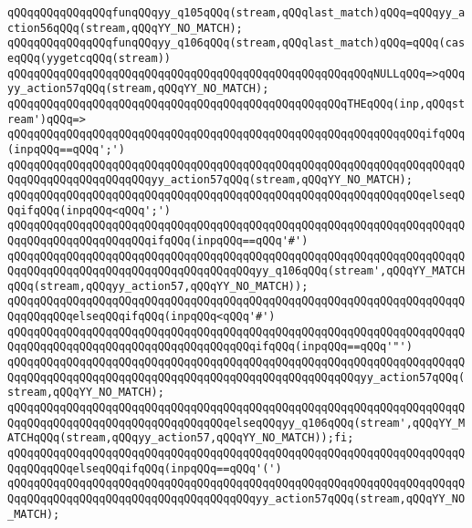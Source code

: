\verb|qQQqqQQqqQQqqQQqfunqQQqyy_q105qQQq(stream,qQQqlast_match)qQQq=qQQqyy_action56qQQq(stream,qQQqYY_NO_MATCH);|\newline
\verb|qQQqqQQqqQQqqQQqfunqQQqyy_q106qQQq(stream,qQQqlast_match)qQQq=qQQq(caseqQQq(yygetcqQQq(stream))|\newline
\verb|qQQqqQQqqQQqqQQqqQQqqQQqqQQqqQQqqQQqqQQqqQQqqQQqqQQqqQQqNULLqQQq=>qQQqyy_action57qQQq(stream,qQQqYY_NO_MATCH);|\newline
\verb|qQQqqQQqqQQqqQQqqQQqqQQqqQQqqQQqqQQqqQQqqQQqqQQqqQQqTHEqQQq(inp,qQQqstream')qQQq=>|\newline
\verb|qQQqqQQqqQQqqQQqqQQqqQQqqQQqqQQqqQQqqQQqqQQqqQQqqQQqqQQqqQQqqQQqifqQQq(inpqQQq==qQQq';')|\newline
\verb|qQQqqQQqqQQqqQQqqQQqqQQqqQQqqQQqqQQqqQQqqQQqqQQqqQQqqQQqqQQqqQQqqQQqqQQqqQQqqQQqqQQqqQQqqQQqyy_action57qQQq(stream,qQQqYY_NO_MATCH);|\newline
\verb|qQQqqQQqqQQqqQQqqQQqqQQqqQQqqQQqqQQqqQQqqQQqqQQqqQQqqQQqqQQqqQQqelseqQQqifqQQq(inpqQQq<qQQq';')|\newline
\verb|qQQqqQQqqQQqqQQqqQQqqQQqqQQqqQQqqQQqqQQqqQQqqQQqqQQqqQQqqQQqqQQqqQQqqQQqqQQqqQQqqQQqqQQqqQQqifqQQq(inpqQQq==qQQq'#')|\newline
\verb|qQQqqQQqqQQqqQQqqQQqqQQqqQQqqQQqqQQqqQQqqQQqqQQqqQQqqQQqqQQqqQQqqQQqqQQqqQQqqQQqqQQqqQQqqQQqqQQqqQQqqQQqqQQqyy_q106qQQq(stream',qQQqYY_MATCHqQQq(stream,qQQqyy_action57,qQQqYY_NO_MATCH));|\newline
\verb|qQQqqQQqqQQqqQQqqQQqqQQqqQQqqQQqqQQqqQQqqQQqqQQqqQQqqQQqqQQqqQQqqQQqqQQqqQQqqQQqelseqQQqifqQQq(inpqQQq<qQQq'#')|\newline
\verb|qQQqqQQqqQQqqQQqqQQqqQQqqQQqqQQqqQQqqQQqqQQqqQQqqQQqqQQqqQQqqQQqqQQqqQQqqQQqqQQqqQQqqQQqqQQqqQQqqQQqqQQqqQQqifqQQq(inpqQQq==qQQq'"')|\newline
\verb|qQQqqQQqqQQqqQQqqQQqqQQqqQQqqQQqqQQqqQQqqQQqqQQqqQQqqQQqqQQqqQQqqQQqqQQqqQQqqQQqqQQqqQQqqQQqqQQqqQQqqQQqqQQqqQQqqQQqqQQqqQQqyy_action57qQQq(stream,qQQqYY_NO_MATCH);|\newline
\verb|qQQqqQQqqQQqqQQqqQQqqQQqqQQqqQQqqQQqqQQqqQQqqQQqqQQqqQQqqQQqqQQqqQQqqQQqqQQqqQQqqQQqqQQqqQQqqQQqqQQqqQQqelseqQQqyy_q106qQQq(stream',qQQqYY_MATCHqQQq(stream,qQQqyy_action57,qQQqYY_NO_MATCH));fi;|\newline
\verb|qQQqqQQqqQQqqQQqqQQqqQQqqQQqqQQqqQQqqQQqqQQqqQQqqQQqqQQqqQQqqQQqqQQqqQQqqQQqqQQqelseqQQqifqQQq(inpqQQq==qQQq'(')|\newline
\verb|qQQqqQQqqQQqqQQqqQQqqQQqqQQqqQQqqQQqqQQqqQQqqQQqqQQqqQQqqQQqqQQqqQQqqQQqqQQqqQQqqQQqqQQqqQQqqQQqqQQqqQQqqQQqyy_action57qQQq(stream,qQQqYY_NO_MATCH);|\newline
